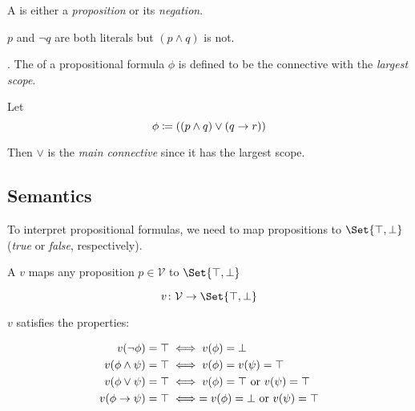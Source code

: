 \begin{definition}[Literal]
    A  is either a \textit{proposition} or 
    its \textit{negation}.
\end{definition}

\begin{example}[Literal]
    $p$ and $\neg q$ are both literals but $(p \land q)$ is not.
\end{example}

\begin{definition}.
    The  of a propositional formula $\phi$ is defined 
    to be the connective with the \textit{largest scope}.
\end{definition}

\begin{example}
    Let
    \begin{equation*}
        \phi \coloneqq ((p \land q) \lor (q \to r))
    \end{equation*}
    
    Then $\lor$ is the \textit{main connective} since it has the largest scope.
\end{example}

\subsection{Semantics}

To interpret propositional formulas, we need  to map 
propositions to $\Set{ \top, \bot }$ (\textit{true} or \textit{false}, 
respectively).

\begin{definition}[Valuation]
    A  $v$ maps any proposition $p \in \mathcal{V}$ 
    to $\Set{ \top, \bot }$
    
    \begin{equation}
        v \colon \mathcal{V} \to \Set{ \top, \bot }
    \end{equation}
    
    $v$ satisfies the properties:
    
    \begin{align}
        v(\neg \phi) = \top &\;\Longleftrightarrow\; v(\phi) = \bot \\
        v(\phi \land \psi) = \top &\;\Longleftrightarrow\; v(\phi) = v(\psi) = \top \\
        v(\phi \lor \psi) = \top 
            &\;\Longleftrightarrow\; v(\phi) = \top \text{ or } v(\psi) = \top \\
        v(\phi \to \psi) = \top 
            &\;\Longleftrightarrow\; = v(\phi) = \bot \text{ or } v(\psi) = \top
    \end{align}
\end{definition}

